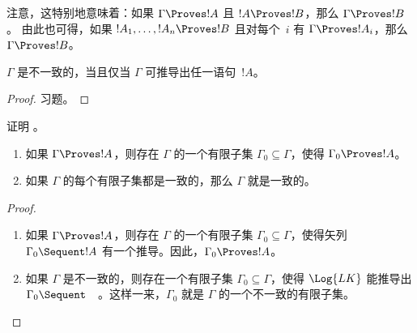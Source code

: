 \documentclass[../../../include/open-logic-section]{subfiles}
\begin{document}
注意，这特别地意味着：如果 $\Gamma \Proves !A$ 且 $!A \Proves !B$，那么 $\Gamma \Proves !B$。
由此也可得，如果 $!A_1,
\dots, !A_n \Proves !B$ 且对每个~$i$ 有 $\Gamma \Proves !A_i$，那么 $\Gamma \Proves !B$。

\begin{prop}
$\Gamma$ 是不一致的，当且仅当 $\Gamma$ 可推导出任一语句~$!A$。
\end{prop}

\begin{proof}
习题。
\end{proof}

\begin{prob}
证明 。
\end{prob}

\begin{prop}[紧致性]
  \begin{enumerate}
  \item 如果 $\Gamma \Proves !A$，则存在 $\Gamma$ 的一个有限子集 $\Gamma_0 \subseteq \Gamma$，使得 $\Gamma_0 \Proves !A$。
  \item 如果 $\Gamma$ 的每个有限子集都是一致的，那么 $\Gamma$ 就是一致的。
  \end{enumerate}
\end{prop}

\begin{proof}
  \begin{enumerate}
    \item 如果 $\Gamma \Proves !A$，则存在 $\Gamma$ 的一个有限子集 $\Gamma_0 \subseteq \Gamma$，使得矢列 $\Gamma_0 \Sequent !A$ 有一个推导。因此，$\Gamma_0 \Proves !A$。
    \item 如果 $\Gamma$ 是不一致的，则存在一个有限子集 $\Gamma_0 \subseteq \Gamma$，使得 $\Log{LK}$ 能推导出 $\Gamma_0 \Sequent \quad$。这样一来，$\Gamma_0$ 就是 $\Gamma$ 的一个不一致的有限子集。
  \end{enumerate}
\end{proof}
\end{document}
